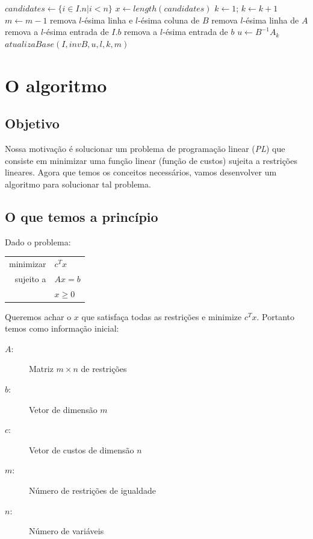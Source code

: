 \documentclass[12pt]{article}
\begin{document}
\begin{algorithmic}
		\State $candidates \gets \{i \in I.n | i< n\}$
		\State $x \gets length(candidates)$
		\State $k \gets 1$;
			\State $k \gets k + 1$
		\EndWhile
			\State $m \gets m - 1$
			\State remova $l$-ésima linha e $l$-ésima coluna de $B$
			\State remova $l$-ésima linha de $A$
			\State remova a $l$-ésima entrada de $I.b$
			\State remova a $l$-ésima entrada de $b$
		\Else
			\State $u \gets B^{-1}A_k$ 
			\State $atualizaBase(I, invB, u, l, k, m)$
		\EndIf 
	\EndFor
\EndFunction
\end{algorithmic}
	

\newpage
\section{O algoritmo}

\subsection{Objetivo}
	Nossa motivação é solucionar um problema de programação linear (\emph{PL}) que consiste em minimizar uma função linear (função de custos) sujeita a restrições lineares. Agora que temos os conceitos necessários, vamos desenvolver um algoritmo para solucionar tal problema.

\subsection{O que temos a princípio}
\label{fase2:args}
	Dado o problema:
    \begin{center}
    	\begin{tabular}{r l}
	  		minimizar & $c^Tx$ \\
        
        	sujeito a & $Ax = b$ \\
            & $x \geq 0$ \\
        \end{tabular}
    \end{center}
  
	Queremos achar o $x$ que satisfaça todas as restrições e minimize $c^Tx$. Portanto temos como informação inicial: 
	\begin{description}
		\item[$A$:] Matriz $m \times n$ de restrições
		\item[$b$:] Vetor de dimensão $m$
        \item[$c$:] Vetor de custos de dimensão $n$
        \item[$m$:] Número de restrições de igualdade
        \item[$n$:] Número de variáveis
	\end{description}
\end{document}
